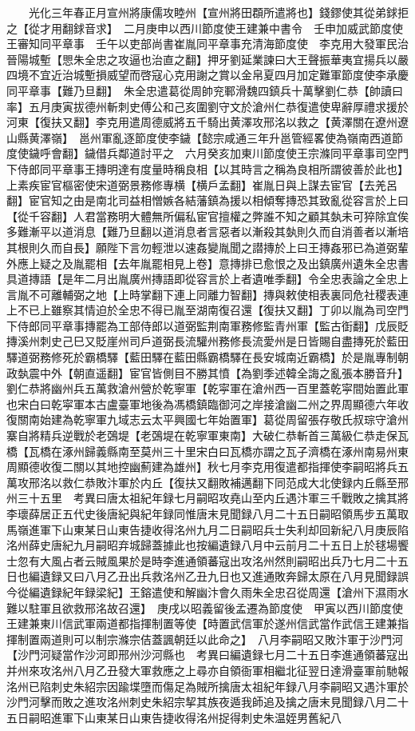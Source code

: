 　　光化三年春正月宣州將康儒攻睦州【宣州將田頵所遣將也】錢鏐使其從弟銶拒之【從才用翻銶音求】　二月庚申以西川節度使王建兼中書令　壬申加威武節度使王審知同平章事　壬午以吏部尚書崔胤同平章事充清海節度使　李克用大發軍民治晉陽城塹【愳朱全忠之攻逼也治直之翻】押牙劉延業諫曰大王聲振華夷宜揚兵以嚴四境不宜近治城塹損威望而啓寇心克用謝之賞以金帛夏四月加定難軍節度使李承慶同平章事【難乃旦翻】　朱全忠遣葛從周帥兖鄆滑魏四鎮兵十萬擊劉仁恭【帥讀曰率】五月庚寅拔德州斬刺史傅公和己亥圍劉守文於滄州仁恭復遣使卑辭厚禮求援於河東【復扶又翻】李克用遣周德威將五千騎出黄澤攻邢洺以救之【黄澤關在遼州遼山縣黄澤嶺】　邕州軍亂逐節度使李鐬【懿宗咸通三年升邕管經畧使為嶺南西道節度使鐬呼會翻】鐬借兵鄰道討平之　六月癸亥加東川節度使王宗滌同平章事司空門下侍郎同平章事王摶明達有度量時稱良相【以其時言之稱為良相所謂彼善於此也】上素疾宦官樞密使宋道弼景務修專横【横戶孟翻】崔胤日與上謀去宦官【去羌呂翻】宦官知之由是南北司益相憎嫉各結藩鎮為援以相傾奪摶恐其致亂從容言於上曰【從千容翻】人君當務明大體無所偏私宦官擅權之弊誰不知之顧其埶未可猝除宜俟多難漸平以道消息【難乃旦翻以道消息者言惡者以漸殺其埶則久而自消善者以漸培其根則久而自長】願陛下言勿輕泄以速姦變胤聞之譛摶於上曰王摶姦邪已為道弼輩外應上疑之及胤罷相【去年胤罷相見上卷】意摶排已愈恨之及出鎮廣州遺朱全忠書具道摶語【是年二月出胤廣州摶語即從容言於上者遺唯季翻】令全忠表論之全忠上言胤不可離輔弼之地【上時掌翻下連上同離力智翻】摶與敕使相表裏同危社稷表連上不已上雖察其情迫於全忠不得已胤至湖南復召還【復扶又翻】丁卯以胤為司空門下侍郎同平章事摶罷為工部侍郎以道弼監荆南軍務修監青州軍【監古衘翻】戊辰貶摶溪州刺史己巳又貶崖州司戶道弼長流驩州務修長流愛州是日皆賜自盡摶死於藍田驛道弼務修死於霸橋驛【藍田驛在藍田縣霸橋驛在長安城南近霸橋】於是胤專制朝政埶震中外【朝直遥翻】宦官皆側目不勝其憤【為劉季述韓全誨之亂張本勝音升】　劉仁恭將幽州兵五萬救滄州營於乾寧軍【乾寜軍在滄州西一百里蓋乾寜間始置此軍也宋白曰乾寜軍本古盧臺軍地後為馮橋鎮臨御河之岸接滄幽二州之界周顯德六年收復關南始建為乾寧軍九域志云太平興國七年始置軍】葛從周留張存敬氏叔琮守滄州寨自將精兵逆戰於老鵶堤【老鵶堤在乾寧軍東南】大破仁恭斬首三萬級仁恭走保瓦橋【瓦橋在涿州歸義縣南至莫州三十里宋白曰瓦橋亦謂之瓦子濟橋在涿州南易州東周顯德收復二關以其地控幽薊建為雄州】秋七月李克用復遣都指揮使李嗣昭將兵五萬攻邢洺以救仁恭敗汴軍於内丘【復扶又翻敗補邁翻下同范成大北使録内丘縣至邢州三十五里　考異曰唐太祖紀年録七月嗣昭攻堯山至内丘遇汴軍三千戰敗之擒其將李瓌薛居正五代史後唐紀與紀年録同惟唐末見聞録八月二十五日嗣昭領馬步五萬取馬嶺進軍下山東某日山東告捷收得洺州九月二日嗣昭兵士失利却回新紀八月庚辰陷洺州薛史唐紀九月嗣昭弃城歸蓋據此也按編遺録八月中云前月二十五日上於毬場饗士忽有大風占者云賊風果於是時李進通領蕃寇出攻洺州然則嗣昭出兵乃七月二十五日也編遺録又曰八月乙丑出兵救洺州乙丑九日也又進通敗奔歸太原在八月見聞録誤今從編遺録紀年録梁紀】王鎔遣使和解幽汴會久雨朱全忠召從周還【滄州下濕雨水難以駐軍且欲救邢洺故召還】　庚戌以昭義留後孟遷為節度使　甲寅以西川節度使王建兼東川信武軍兩道都指揮制置等使【時置武信軍於遂州信武當作武信王建兼指揮制置兩道則可以制宗滌宗佶蓋諷朝廷以此命之】　八月李嗣昭又敗汴軍于沙門河【沙門河疑當作沙河即邢州沙河縣也　考異曰編遺録七月二十五日李進通領蕃寇出并州來攻洺州八月乙丑發大軍救應之上尋亦自領衙軍相繼北征翌日達滑臺軍前馳報洺州已陷刺史朱紹宗因踰堞墮而傷足為賊所擒唐太祖紀年録八月李嗣昭又遇汴軍於沙門河擊而敗之進攻洺州刺史朱紹宗挈其族夜遁我師追及擒之唐末見聞録八月二十五日嗣昭進軍下山東某日山東告捷收得洺州捉得刺史朱温姪男舊紀八